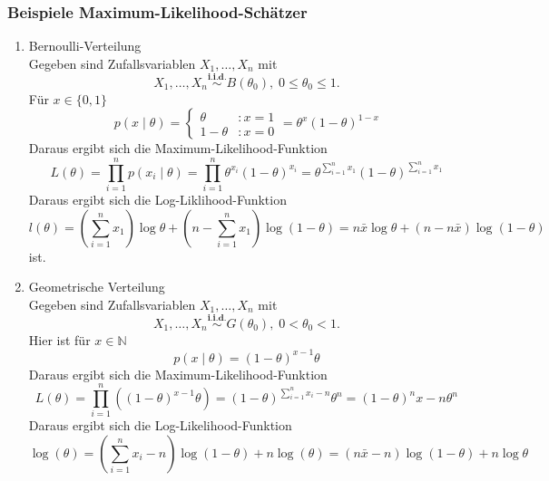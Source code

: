 \documentclass[10pt]{article}
\newcommand{\FZV}{X_1, \ldots, X_n} %
\newcommand{\xt}{x \mid \theta} %
\begin{document}
	\subsubsection{Beispiele Maximum-Likelihood-Schätzer}
		\begin{enumerate}[label = (\roman*)]
		\item Bernoulli-Verteilung \\
		Gegeben sind Zufallsvariablen $\FZV$ mit
		\begin{equation*}
			\FZV \overset{\textbf{i.i.d.}}{\sim} B(\theta_0), \; 0 \leq \theta_0 \leq 1.
		\end{equation*} 
		Für $x \in \{0,1\}$
		\begin{equation*}
			p(\xt) = \begin{cases}
				\theta &: x=1 \\
				1- \theta&: x=0
			\end{cases} = \theta^x (1-\theta)^{1-x}
		\end{equation*}
		Daraus ergibt sich die Maximum-Likelihood-Funktion
		\begin{equation*}
			L(\theta) = \prod_{i=1}^{n} p(x_i \mid \theta) =\prod_{i=1}^{n} \theta^{x_i} (1-\theta)^{x_i} = \theta^{\sum_{i=1}^{n}x_1}(1-\theta)^{\sum_{i=1}^{n}x_1}
		\end{equation*}
		Daraus ergibt sich die Log-Liklihood-Funktion
		\begin{equation*}
			l(\theta) = \left(\sum_{i=1}^{n}x_1\right) \log \theta + \left(n-\sum_{i=1}^{n}x_1\right) \log(1-\theta) = n\bar{x}\log\theta + (n-n\bar{x})\log(1-\theta)
		\end{equation*}
		ist.
		
		\item Geometrische Verteilung \\
		Gegeben sind Zufallsvariablen $\FZV$ mit
		\begin{equation*}
			\FZV \overset{\textbf{i.i.d.}}{\sim} G(\theta_0), \; 0 < \theta_0 < 1.
		\end{equation*} 
		Hier ist für $x\in \mathbb{N}$
		\begin{equation*}
			p(\xt)=(1-\theta)^{x-1}\theta
		\end{equation*}
		Daraus ergibt sich die Maximum-Likelihood-Funktion
		\begin{equation*}
			L (\theta) = \prod_{i=1}^{n} ((1-\theta)^{x-1}\theta) = (1-\theta)^{\sum_{i=1}^{n}x_i -n} \theta^n = (1-\theta)^nx-n \theta^n
		\end{equation*}
		Daraus ergibt sich die Log-Likelihood-Funktion
		\begin{equation*}
			\log(\theta)= (\sum_{i=1}^{n}x_i -n)\log(1-\theta)+n\log(\theta) = (n\bar{x}-n)\log(1-\theta)+ n\log\theta
		\end{equation*}
		

\end{enumerate}
\end{document}
